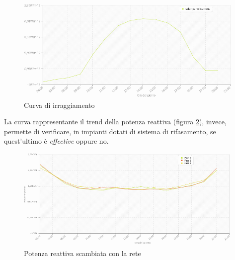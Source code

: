%
\begin{figure}[!h]
\centering
\includegraphics[width=400pt]{img/portale/radiazione-giornaliera.png} %
\caption{Curva di irraggiamento}
\label{fig:irradiance}
\end{figure}
%

%
La curva rappresentante il trend della potenza reattiva (figura \ref{fig:reactive-power-tr}), 
invece, permette di verificare, in impianti dotati di sistema di rifasamento, se quest'ultimo
\`e \emph{effective} oppure no. %
%
\begin{figure}[!h]
\centering
\includegraphics[width=400pt]{img/portale/reactive-power-power-transponder.png}
\caption{Potenza reattiva scambiata con la rete}
\label{fig:reactive-power-tr}
\end{figure}
%
